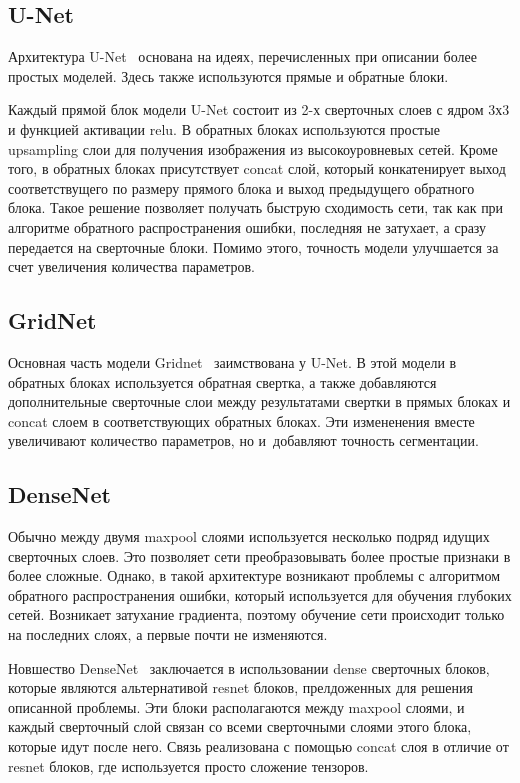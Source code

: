 \subsection{U-Net}

Архитектура U-Net~\cite{unet} основана на идеях, перечисленных при описании более простых моделей. Здесь также используются прямые и обратные блоки. 

Каждый прямой блок модели U-Net состоит из 2-х сверточных слоев с ядром 3х3 и функцией активации relu. В обратных блоках используются простые upsampling слои для получения изображения из высокоуровневых сетей. Кроме того, в обратных блоках присутствует concat слой, который конкатенирует выход соответствущего по размеру прямого блока и выход предыдущего обратного блока. Такое решение позволяет получать быструю сходимость сети, так как при алгоритме обратного распространения ошибки, последняя не затухает, а сразу передается на сверточные блоки. Помимо этого, точность модели улучшается за счет увеличения количества параметров.   

\subsection{GridNet}

Основная часть модели Gridnet~\cite{gridnet} заимствована у U-Net. В этой модели в обратных блоках используется обратная свертка, а также добавляются дополнительные сверточные слои между результатами свертки в прямых блоках и concat слоем в соответствующих обратных блоках. Эти измененения вместе увеличивают количество параметров, но и~добавляют точность сегментации.

\subsection{DenseNet}

Обычно между двумя maxpool слоями используется несколько подряд идущих сверточных слоев. Это позволяет сети преобразовывать более простые признаки в более сложные. Однако, в такой архитектуре возникают проблемы с алгоритмом обратного распространения ошибки, который используется для обучения глубоких сетей. Возникает затухание градиента, поэтому обучение сети происходит только на последних слоях, а первые почти не изменяются. 

Новшество DenseNet~\cite{densenet} заключается в использовании dense сверточных блоков, которые являются альтернативой resnet блоков\cite{resnet}, прелдоженных для решения описанной проблемы. Эти блоки располагаются между maxpool слоями, и каждый сверточный слой связан со всеми сверточными слоями этого блока, которые идут после него. Связь реализована с помощью concat слоя в отличие от resnet блоков, где используется просто сложение тензоров.   

